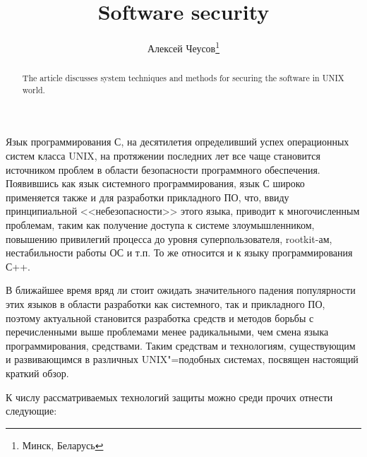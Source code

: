 \documentclass[10pt, a5paper]{article}
\begin{document}
\title{Software security}%

\author{Алексей Чеусов\footnote{Минск, Беларусь}}
\maketitle

\begin{abstract}
The article discusses system techniques and methods for securing the software in UNIX world.
\end{abstract}

Язык программирования С, на десятилетия определивший успех операционных систем класса UNIX, на протяжении последних лет все чаще
становится источником проблем в области безопасности программного
обеспечения. Появившись как язык системного программирования, язык С
широко применяется также и для разработки прикладного ПО, что, ввиду принципиальной <<небезопасности>> этого языка, приводит к многочисленным проблемам, таким как получение доступа к системе злоумышленником, повышению привилегий процесса до уровня суперпользователя, rootkit-ам, нестабильности работы ОС и т.п. То же относится и к языку программирования С++.

В ближайшее время вряд ли стоит ожидать значительного падения популярности этих языков в области разработки как системного, так и прикладного ПО, поэтому
актуальной становится разработка средств и методов борьбы с
перечисленными выше проблемами менее радикальными, чем смена языка
программирования, средствами. Таким средствам и технологиям, существующим и развивающимся в различных UNIX"=подобных системах, посвящен настоящий краткий обзор.

К числу рассматриваемых технологий защиты можно среди прочих отнести следующие:
\end{document}
